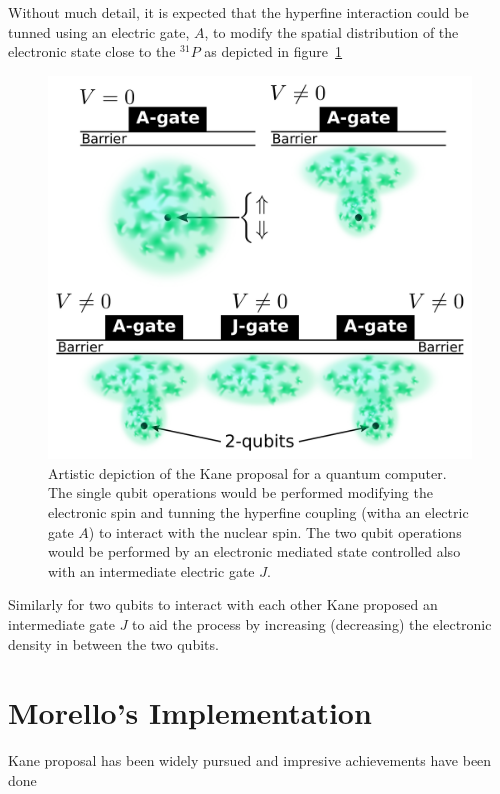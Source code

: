 Without much detail, it is expected that the hyperfine interaction could be tunned using an electric gate, $A$, to modify the spatial distribution of the electronic state close to the $^{31}P$ as depicted in figure~\ref{kane}
\begin{figure}[h!]
\centering
\includegraphics{chapter03/figures/kane.pdf}
\vspace{-5pt}
\caption{Artistic depiction of the Kane proposal for a quantum computer. The single qubit operations would be performed modifying the electronic spin and tunning the hyperfine coupling (witha an electric gate $A$) to interact with the nuclear spin. The two qubit operations would be performed by an electronic mediated state controlled also with an intermediate electric gate $J$.}
\label{kane}
\end{figure}
\FloatBarrier
Similarly for two qubits to interact with each other Kane proposed an intermediate gate $J$ to aid the process by increasing (decreasing) the electronic density in between the two qubits.

\section{Morello's Implementation}
Kane proposal has been widely pursued and impresive achievements have been done



